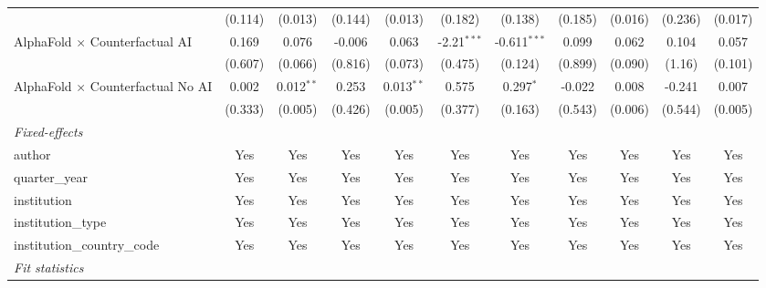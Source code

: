 \begin{tabular}{lcccccccccc}
                                            & (0.114)        & (0.013)        & (0.144)        & (0.013)        & (0.182)       & (0.138)        & (0.185)       & (0.016)        & (0.236)       & (0.017)\\   
   AlphaFold $\times$ Counterfactual AI     & 0.169          & 0.076          & -0.006         & 0.063          & -2.21$^{***}$ & -0.611$^{***}$ & 0.099         & 0.062          & 0.104         & 0.057\\   
                                            & (0.607)        & (0.066)        & (0.816)        & (0.073)        & (0.475)       & (0.124)        & (0.899)       & (0.090)        & (1.16)        & (0.101)\\   
   AlphaFold $\times$ Counterfactual No AI  & 0.002          & 0.012$^{**}$   & 0.253          & 0.013$^{**}$   & 0.575         & 0.297$^{*}$    & -0.022        & 0.008          & -0.241        & 0.007\\   
                                            & (0.333)        & (0.005)        & (0.426)        & (0.005)        & (0.377)       & (0.163)        & (0.543)       & (0.006)        & (0.544)       & (0.005)\\   
   \midrule
   \emph{Fixed-effects}\\
   author                                   & Yes            & Yes            & Yes            & Yes            & Yes           & Yes            & Yes           & Yes            & Yes           & Yes\\  
   quarter\_year                            & Yes            & Yes            & Yes            & Yes            & Yes           & Yes            & Yes           & Yes            & Yes           & Yes\\  
   institution                              & Yes            & Yes            & Yes            & Yes            & Yes           & Yes            & Yes           & Yes            & Yes           & Yes\\  
   institution\_type                        & Yes            & Yes            & Yes            & Yes            & Yes           & Yes            & Yes           & Yes            & Yes           & Yes\\  
   institution\_country\_code               & Yes            & Yes            & Yes            & Yes            & Yes           & Yes            & Yes           & Yes            & Yes           & Yes\\  
   \midrule
   \emph{Fit statistics}\\

\end{tabular}
